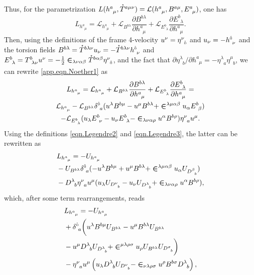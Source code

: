 \documentclass[
10pt, %
a4paper, %
oneside, %
twocolumn,
headinclude,footinclude, %
BCOR5mm, %
]{scrartcl}
\newcommand{\tetrsymbol}{h}
\newcommand{\itetrsymbol}{\eta}
\newcommand{\itetr}[2]{\itetrsymbol^{#1}_{\phantom{#1}#2}}
\newcommand{\tetr}[2]{\tetrsymbol^{#1}_{\phantom{#1}#2}}
\newcommand{\Tors}[2]{T^{#1}_{\phantom{#1}#2}}
\newcommand{\ET}[2]{E^{#1}_{\phantom{#1}#2}}	%
\newcommand{\Dm}[2]{D_{\phantom{#2}#1}^{#2}}	%
\newcommand{\BT}[2]{B^{#1#2}}	%
\newcommand{\Bm}[2]{B^{#1#2}}	%
\newcommand{\Laghodge}{L}%
\newcommand{\LagBE}{\mathcal{L}}%
\newcommand{\Um}{U}%
\newcommand{\LCsymb}{\bm{\in}}    %
\newcommand{\HDT}[1]{\accentset{\star}{T}^{#1}}
\newcommand{\KD}[2]{\delta^{#1}_{\ #2}}
\newcommand{\indalg}[1]{\hat{\mathsmaller{#1}}}
\begin{document}
	Thus, for the parametrization
	$ \Laghodge(\tetr{a}{\mu},\HDT{a\mu\nu}) = \LagBE(\tetr{a}{\mu},\BT{a}{\mu},\ET{a}{\mu}) $, one 
	has
	\begin{equation}\label{app.eqn.Noether1}
		\Laghodge_{\tetr{a}{\mu}} = \LagBE_{\tetr{a}{\mu}} 
		+ \LagBE_{\BT{b}{\lambda}} \frac{\partial \BT{b}{\lambda}}{\partial \tetr{a}{\mu}}
		+ \LagBE_{\ET{b}{\lambda}} \frac{\partial \ET{b}{\lambda}}{\partial \tetr{a}{\mu}}.
	\end{equation}
	Then, using the definitions of the frame 4-velocity $ u^\nu = \itetr{\nu}{\indalg{0}} $ and $ 
	u_\nu 
	= 
	-\tetr{\indalg{0}}{\nu} $ and the torsion fields
	$ \BT{b}{\lambda} = \HDT{b\lambda\nu} u_\nu = - \HDT{b\lambda\nu} \tetr{\indalg{0}}{\nu}$ and 
	$ \ET{b}{\lambda} = \Tors{b}{\lambda\nu} u^\nu = 
	-\frac12\LCsymb_{\lambda\nu\alpha\beta}\HDT{b\alpha\beta} \itetr{\nu}{\indalg{0}}$, and the 
	fact 
	that $ \partial\itetr{\lambda}{b}/\partial\tetr{a}{\mu} = -\itetr{\lambda}{a}\itetr{\mu}{b} $, 
	we 
	can rewrite \eqref{app.eqn.Noether1} as
	\begin{multline}
		\Laghodge_{\tetr{a}{\mu}} = \LagBE_{\tetr{a}{\mu}} 
		+ \LagBE_{\BT{b}{\lambda}} \frac{\partial \BT{b}{\lambda}}{\partial \tetr{a}{\mu}}
		+ \LagBE_{\ET{b}{\lambda}} \frac{\partial \ET{b}{\lambda}}{\partial \tetr{a}{\mu}} = \\
		\LagBE_{\tetr{a}{\mu}} - \LagBE_{\BT{b}{\lambda}} \KD{\indalg{0}}{a}
		(u^\lambda \BT{b}{\mu} - u^\mu \BT{b}{\lambda}+\LCsymb^{\lambda\mu\alpha\beta} u_\alpha  
		\ET{b}{\beta}) \\
		-\LagBE_{\ET{b}{\lambda}} (u_\lambda \ET{b}{\nu} - u_\nu \ET{b}{\lambda} - 
		\LCsymb_{\lambda\nu\alpha\rho}u^\alpha\BT{b}{\rho})\itetr{\nu}{a}u^\mu.
	\end{multline}
	Using the definitions \eqref{eqn.Legendre2} and \eqref{eqn.Legendre3}, the latter can be 
	rewritten 
	as
	\begin{align}
		&\Laghodge_{\tetr{a}{\mu}} =
		-\Um_{\tetr{a}{\mu}} \nonumber\\
		&- \Um_{\Bm{b}{\lambda}} \KD{\indalg{0}}{a}
		(-u^\lambda \Bm{b}{\mu} + u^\mu \Bm{b}{\lambda}+\LCsymb^{\lambda\mu\alpha\beta} u_\alpha 
		\Um_{\Dm{b}{\beta}}) \nonumber\\
		&-\Dm{b}{\lambda} \itetr{\nu}{a}u^\mu (u_\lambda \Um_{\Dm{b}{\nu}} - u_\nu 
		\Um_{\Dm{b}{\lambda}} + 
		\LCsymb_{\lambda\nu\alpha\rho}u^\alpha\Bm{b}{\rho}),
	\end{align}
	which, after some term rearrangements, reads
	\begin{align}\label{eqn.J.BD}
		&\Laghodge_{\tetr{a}{\mu}} =
		-\Um_{\tetr{a}{\mu}} 
		\nonumber\\
		&+ \KD{\indalg{0}}{a}
		\bigg( 
		u^\lambda \Bm{b}{\mu} \Um_{\Bm{b}{\lambda}} 
		- u^\mu \Bm{b}{\lambda} \Um_{\Bm{b}{\lambda}} 
		\nonumber\\
		&- u^\mu \Dm{b}{\lambda} \Um_{\Dm{b}{\lambda}}
		+ \LCsymb^{\mu\lambda\rho\sigma} u_\rho \Um_{\Bm{b}{\lambda}}
		\Um_{\Dm{b}{\sigma}} 
		\bigg) \nonumber\\
		&- \itetr{\nu}{a}u^\mu
		\left(
		u_\lambda \Dm{b}{\lambda} \Um_{\Dm{b}{\nu}} 
		- \LCsymb_{\nu\lambda\rho\sigma}u^\rho\Bm{b}{\sigma}\Dm{b}{\lambda}
		\right),
	\end{align}
\end{document}
